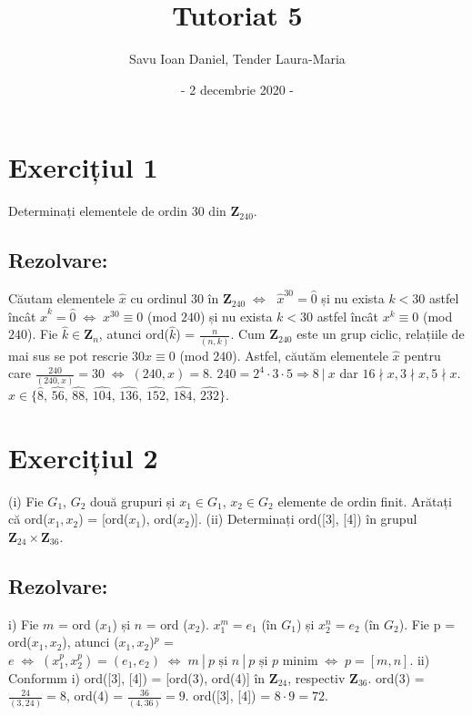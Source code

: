\documentclass{article}
\title{Tutoriat 5 \\
\Large }
\date{- 2 decembrie 2020 -}
\author{Savu Ioan Daniel, Tender Laura-Maria}
\DeclareRobustCommand\iff{\;\Longleftrightarrow\;}
\begin{document}
\maketitle
\section{Exercițiul 1}
Determinați elementele de ordin $30$ din $\mathbf{Z}_{240}$.
\subsection{Rezolvare:}
Căutam elementele $\widehat{x}$ cu ordinul $30$ în $\mathbf{Z}_{240} \iff$ $\widehat{x}^{30} = \widehat{0}$ și nu exista $k < 30$ astfel încât $\widehat{x}^{k} = \widehat{0} \iff x^{30} \equiv 0$ (mod $240$) și nu exista $k < 30$ astfel încât $x^{k} \equiv 0$ (mod $240$).
\newline
Fie $\widehat{k} \in \mathbf{Z}_n$, atunci ord($\widehat{k}$) = $\frac{n}{(n,k)}$.
\newline
Cum $\mathbf{Z}_{240}$ este un grup ciclic, relațiile de mai sus se pot rescrie $30x \equiv 0 $ (mod $240$). Astfel, căutăm elementele $\widehat{x}$ pentru care $\frac{240}{(240, x)} = 30 \iff (240, x) = 8$.
\newline
$240 = 2^4 \cdot 3 \cdot 5 \Rightarrow 8 \ | \ x$ dar $16 \nmid x, 3 \nmid x, 5 \nmid x$. 
\newline
$\widehat{x} \in \{\widehat{8}, \, \widehat{56}, \, \widehat{88}, \, \widehat{104}, \, \widehat{136}, \, \widehat{152}, \, \widehat{184}, \, \widehat{232}\}$.

\section{Exercițiul 2}
(i) Fie $G_1$, $G_2$ două grupuri și $x_1 \in G_1$, $x_2 \in G_2$ elemente de ordin finit. Arătați că ord($x_1, x_2$) = [ord($x_1$), ord($x_2$)].
\newline
(ii) Determinați ord([3], [4]) în grupul $\mathbf{Z}_{24} \times \mathbf{Z}_{36}$.
\subsection{Rezolvare:}
i) Fie $m$ = ord ($x_1$) și $n$ = ord ($x_2$). $x_1^m = e_1$ (în $G_1$) și $x_2^n = e_2$ (în $G_2$).  
\newline
Fie p = ord($x_1, x_2$), atunci ($x_1, x_2$)$^p$ = $e \iff (x_1^p, x_2^p) = (e_1, e_2) \iff m \ | \ p \text{ și } n \ | \ p \text{ și } p \text{ minim} \iff p = [m, n]$.  
\newline \newline
ii) Conformm i) ord([3], [4]) = [ord(3), ord(4)] în $\mathbf{Z}_{24}$, respectiv $\mathbf{Z}_{36}$.
\newline
ord(3) = $\frac{24}{(3, 24)} = 8$, ord(4) = $\frac{36}{(4, 36)} = 9$.
\newline
ord([3], [4]) = $8 \cdot 9 = 72$.
\end{document}
